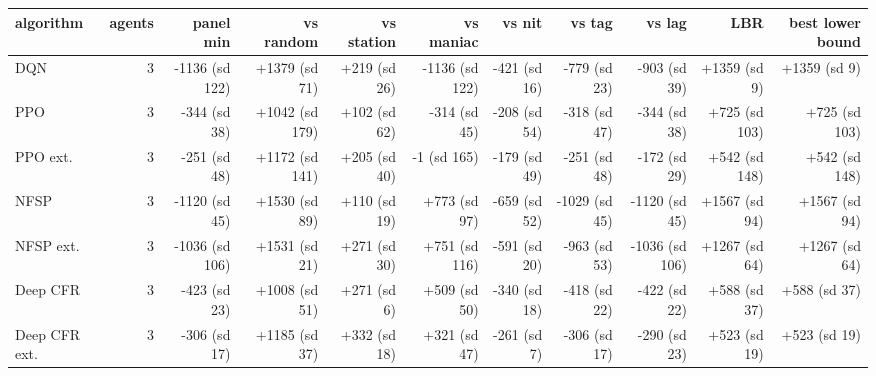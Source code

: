 \begin{tabular}{lrrrrrrrrrr}
\toprule
algorithm & agents & panel min & vs random & vs station & vs maniac & vs nit & vs tag & vs lag & LBR & best lower bound \\
\midrule
DQN & 3 & -1136 (sd 122) & +1379 (sd 71) & +219 (sd 26) & -1136 (sd 122) & -421 (sd 16) & -779 (sd 23) & -903 (sd 39) & +1359 (sd 9) & +1359 (sd 9) \\
PPO & 3 & -344 (sd 38) & +1042 (sd 179) & +102 (sd 62) & -314 (sd 45) & -208 (sd 54) & -318 (sd 47) & -344 (sd 38) & +725 (sd 103) & +725 (sd 103) \\
PPO ext. & 3 & -251 (sd 48) & +1172 (sd 141) & +205 (sd 40) & -1 (sd 165) & -179 (sd 49) & -251 (sd 48) & -172 (sd 29) & +542 (sd 148) & +542 (sd 148) \\
NFSP & 3 & -1120 (sd 45) & +1530 (sd 89) & +110 (sd 19) & +773 (sd 97) & -659 (sd 52) & -1029 (sd 45) & -1120 (sd 45) & +1567 (sd 94) & +1567 (sd 94) \\
NFSP ext. & 3 & -1036 (sd 106) & +1531 (sd 21) & +271 (sd 30) & +751 (sd 116) & -591 (sd 20) & -963 (sd 53) & -1036 (sd 106) & +1267 (sd 64) & +1267 (sd 64) \\
Deep CFR & 3 & -423 (sd 23) & +1008 (sd 51) & +271 (sd 6) & +509 (sd 50) & -340 (sd 18) & -418 (sd 22) & -422 (sd 22) & +588 (sd 37) & +588 (sd 37) \\
Deep CFR ext. & 3 & -306 (sd 17) & +1185 (sd 37) & +332 (sd 18) & +321 (sd 47) & -261 (sd 7) & -306 (sd 17) & -290 (sd 23) & +523 (sd 19) & +523 (sd 19) \\
\bottomrule
\end{tabular}
